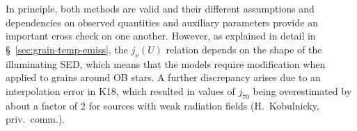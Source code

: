 In principle, both methods are valid and their different assumptions
and dependencies on observed quantities and auxiliary parameters
provide an important cross check on one another.  However, as
explained in detail in \S~\ref{sec:grain-temp-emiss}, the \(j_\nu(U)\)
relation depends on the shape of the illuminating SED, which means
that the \citet{Draine:2007a} models require modification when applied
to grains around OB stars.  A further discrepancy arises due to an
interpolation error in K18, which resulted in values of \(j_{70}\)
being overestimated by about a factor of 2 for sources with weak
radiation fields (H.~Kobulnicky, priv.~comm.).






